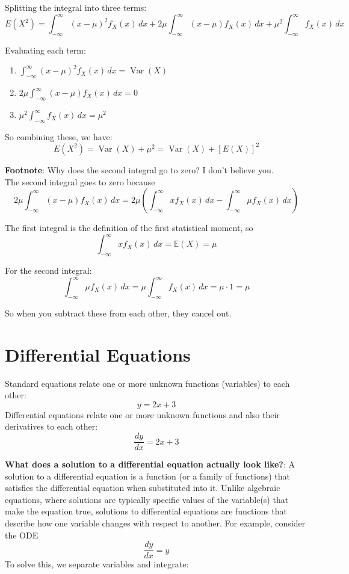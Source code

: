 \documentclass[12pt]{article}
\begin{document}
Splitting the integral into three terms:
\[
E(X^2) = \int_{-\infty}^{\infty} (x - \mu)^2 f_X(x) \, dx + 2\mu \int_{-\infty}^{\infty} (x - \mu) f_X(x) \, dx + \mu^2 \int_{-\infty}^{\infty} f_X(x) \, dx
\]

Evaluating each term:
\begin{enumerate}
\item \(\int_{-\infty}^{\infty} (x - \mu)^2 f_X(x) \, dx = \operatorname{Var}(X)\)
\item \(2\mu \int_{-\infty}^{\infty} (x - \mu) f_X(x) \, dx = 0\)
\item \(\mu^2 \int_{-\infty}^{\infty} f_X(x) \, dx = \mu^2\)
\end{enumerate}


So combining these, we have:
\[
E(X^2) = \operatorname{Var}(X) + \mu^2 = \operatorname{Var}(X) + [E(X)]^2
\]

\textbf{Footnote}: Why does the second integral go to zero? I don't believe you.\\
The second integral goes to zero because 
\[
2\mu \int_{-\infty}^{\infty} (x - \mu) f_X(x) \, dx = 2\mu \left(\int_{-\infty}^{\infty}x f_X(x)\, dx - \int_{-\infty}^{\infty} \mu f_X(x)\, dx \right)
\]

The first integral is the definition of the first statistical moment, so 
\[
\int_{-\infty}^{\infty}x f_X(x)\, dx = \mathbb{E}(X) = \mu
\]

For the second integral:
\[
\int_{-\infty}^{\infty} \mu f_X(x)\, dx = \mu \int_{-\infty}^{\infty} f_X(x)\, dx = \mu \cdot 1 = \mu
\]

So when you subtract these from each other, they cancel out.



\section{Differential Equations}
Standard equations relate one or more unknown functions (variables) to each other: 
\[y = 2x + 3\]
Differential equations relate one or more unknown functions and also their derivatives to each other:
\[\frac{dy}{dx} = 2x + 3\]

\textbf{What does a solution to a differential equation actually look like?}: A solution to a differential equation is a function (or a family of functions) that satisfies the differential equation when substituted into it. Unlike algebraic equations, where solutions are typically specific values of the variable(s) that make the equation true, solutions to differential equations are functions that describe how one variable changes with respect to another. For example, consider the ODE
\[\frac{dy}{dx} = y\] 
To solve this, we separate variables and integrate:
\end{document}
